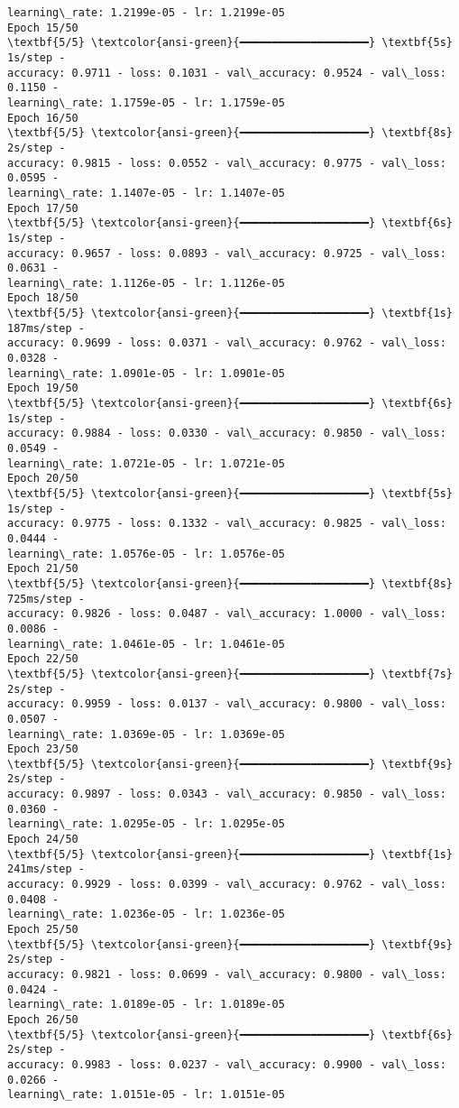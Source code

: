 \documentclass[11pt]{article}
\begin{document}
\begin{Verbatim}[commandchars=\\\{\}]
learning\_rate: 1.2199e-05 - lr: 1.2199e-05
Epoch 15/50
\textbf{5/5} \textcolor{ansi-green}{━━━━━━━━━━━━━━━━━━━━} \textbf{5s} 1s/step -
accuracy: 0.9711 - loss: 0.1031 - val\_accuracy: 0.9524 - val\_loss: 0.1150 -
learning\_rate: 1.1759e-05 - lr: 1.1759e-05
Epoch 16/50
\textbf{5/5} \textcolor{ansi-green}{━━━━━━━━━━━━━━━━━━━━} \textbf{8s} 2s/step -
accuracy: 0.9815 - loss: 0.0552 - val\_accuracy: 0.9775 - val\_loss: 0.0595 -
learning\_rate: 1.1407e-05 - lr: 1.1407e-05
Epoch 17/50
\textbf{5/5} \textcolor{ansi-green}{━━━━━━━━━━━━━━━━━━━━} \textbf{6s} 1s/step -
accuracy: 0.9657 - loss: 0.0893 - val\_accuracy: 0.9725 - val\_loss: 0.0631 -
learning\_rate: 1.1126e-05 - lr: 1.1126e-05
Epoch 18/50
\textbf{5/5} \textcolor{ansi-green}{━━━━━━━━━━━━━━━━━━━━} \textbf{1s} 187ms/step -
accuracy: 0.9699 - loss: 0.0371 - val\_accuracy: 0.9762 - val\_loss: 0.0328 -
learning\_rate: 1.0901e-05 - lr: 1.0901e-05
Epoch 19/50
\textbf{5/5} \textcolor{ansi-green}{━━━━━━━━━━━━━━━━━━━━} \textbf{6s} 1s/step -
accuracy: 0.9884 - loss: 0.0330 - val\_accuracy: 0.9850 - val\_loss: 0.0549 -
learning\_rate: 1.0721e-05 - lr: 1.0721e-05
Epoch 20/50
\textbf{5/5} \textcolor{ansi-green}{━━━━━━━━━━━━━━━━━━━━} \textbf{5s} 1s/step -
accuracy: 0.9775 - loss: 0.1332 - val\_accuracy: 0.9825 - val\_loss: 0.0444 -
learning\_rate: 1.0576e-05 - lr: 1.0576e-05
Epoch 21/50
\textbf{5/5} \textcolor{ansi-green}{━━━━━━━━━━━━━━━━━━━━} \textbf{8s} 725ms/step -
accuracy: 0.9826 - loss: 0.0487 - val\_accuracy: 1.0000 - val\_loss: 0.0086 -
learning\_rate: 1.0461e-05 - lr: 1.0461e-05
Epoch 22/50
\textbf{5/5} \textcolor{ansi-green}{━━━━━━━━━━━━━━━━━━━━} \textbf{7s} 2s/step -
accuracy: 0.9959 - loss: 0.0137 - val\_accuracy: 0.9800 - val\_loss: 0.0507 -
learning\_rate: 1.0369e-05 - lr: 1.0369e-05
Epoch 23/50
\textbf{5/5} \textcolor{ansi-green}{━━━━━━━━━━━━━━━━━━━━} \textbf{9s} 2s/step -
accuracy: 0.9897 - loss: 0.0343 - val\_accuracy: 0.9850 - val\_loss: 0.0360 -
learning\_rate: 1.0295e-05 - lr: 1.0295e-05
Epoch 24/50
\textbf{5/5} \textcolor{ansi-green}{━━━━━━━━━━━━━━━━━━━━} \textbf{1s} 241ms/step -
accuracy: 0.9929 - loss: 0.0399 - val\_accuracy: 0.9762 - val\_loss: 0.0408 -
learning\_rate: 1.0236e-05 - lr: 1.0236e-05
Epoch 25/50
\textbf{5/5} \textcolor{ansi-green}{━━━━━━━━━━━━━━━━━━━━} \textbf{9s} 2s/step -
accuracy: 0.9821 - loss: 0.0699 - val\_accuracy: 0.9800 - val\_loss: 0.0424 -
learning\_rate: 1.0189e-05 - lr: 1.0189e-05
Epoch 26/50
\textbf{5/5} \textcolor{ansi-green}{━━━━━━━━━━━━━━━━━━━━} \textbf{6s} 2s/step -
accuracy: 0.9983 - loss: 0.0237 - val\_accuracy: 0.9900 - val\_loss: 0.0266 -
learning\_rate: 1.0151e-05 - lr: 1.0151e-05

\end{Verbatim}
\end{document}
